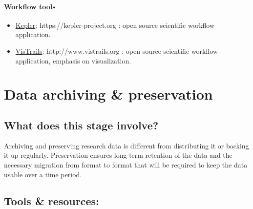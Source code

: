 \documentclass{tufte-handout}
\begin{document}
\paragraph{Workflow tools}\label{workflow-tools}

\begin{itemize}
\itemsep1pt\parskip0pt
\item
  \href{https://kepler-project.org}{Kepler}:
  https://kepler-project.org : open source scientific workflow
  application.
\item
  \href{http://www.vistrails.org/index.php/Main_Page}{VisTrails}:
  http://www.vistrails.org : open source scientific workflow
  application, emphasis on visualization.
\end{itemize}


\section{Data archiving \&
preservation}\label{data-archiving-preservation} 

\subsection{What does this stage
involve?}\label{what-does-this-stage-involve}

Archiving and preserving research data is different from distributing it
or backing it up regularly. Preservation ensures long-term retention of
the data and the necessary migration from format to format that will be
required to keep the data usable over a time period.

\subsection{Tools \& resources:}\label{what-tools-and-resources-are-available-2}
\end{document}
